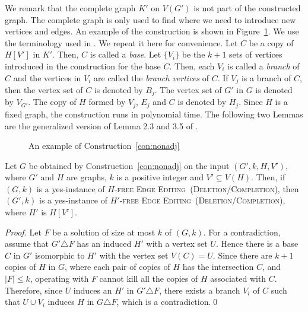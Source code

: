 \documentclass[envcountsame,envcountsect,10pt,oribibl]{llncs}
\newcommand{\pname}[1]{\textnormal{\textsc{#1}}}
\newcommand{\HEE}{\pname{$H$-free Edge Editing}}
\newcommand{\HDEE}{\pname{$H'$-free Edge Editing}}
\begin{document}
We remark that the complete graph $K'$ on $V(G')$ is not part of the constructed graph.
The complete graph is only used to find where we need to introduce new vertices and edges.
An example of the construction is shown in Figure~\ref{fig:cons}.
We use the terminology used in \cite{DBLP:conf/cocoa/AravindSS15}. We repeat it here for convenience.
Let $C$ be a copy of $H[V']$ in $K'$. Then, $C$ is called a \emph{base}.
Let $\{V_i\}$ be the $k+1$ sets of vertices introduced in the construction for the base $C$.
Then, each $V_i$ is called a \emph{branch} of $C$ and the vertices in $V_i$ are called 
the \emph{branch vertices} of $C$. If $V_j$ is a branch of $C$, then
the vertex set of $C$ is denoted by $B_j$.
The vertex set of $G'$ in $G$ is denoted by $V_{G'}$. The copy of $H$ formed by $V_j$, $E_j$
and $C$ is denoted by $H_j$. Since $H$ is a fixed graph, the construction runs in polynomial time. 
The following two Lemmas are the generalized version of Lemma 2.3 and 3.5 of \cite{DBLP:conf/cocoa/AravindSS15}.

\begin{figure}[h]
  \centering
  \qquad
  \qquad
  \caption{An example of Construction~\ref{con:nonadj}}
  \label{fig:cons}
\end{figure}

\begin{lemma}
  \label{lem:con:nonadj-backward}
  Let $G$ be obtained by Construction~\ref{con:nonadj} on 
  the input $(G',k,H,V')$, where $G'$ and $H$ are graphs, $k$ is a positive integer and $V'\subseteq V(H)$.
  Then, if $(G,k)$ is a yes-instance of \HEE~(\textsc{Deletion}/\textsc{Completion}), 
  then $(G',k)$ is a yes-instance of \HDEE~(\textsc{Deletion}/\textsc{Completion}), 
  where $H'$ is $H[V']$.
\end{lemma}
\begin{proof}
  Let $F$ be a solution of size at most $k$ of $(G,k)$. For a contradiction, assume that $G'\triangle F$
  has an induced $H'$ with a vertex set $U$. Hence there is a base $C$ in $G'$ isomorphic to
  $H'$ with the vertex set $V(C)=U$. Since there are $k+1$ copies of $H$ in $G$, where each pair
  of copies of $H$ has the intersection $C$, and $|F|\leq k$, operating with $F$ cannot kill all the copies of 
  $H$ associated with $C$. Therefore,
  since $U$ induces an $H'$ in $G'\triangle F$, there exists a branch $V_i$ of $C$ such that $U\cup V_i$
  induces $H$ in $G\triangle F$, which is a contradiction.\qed
\end{proof}
\end{document}
